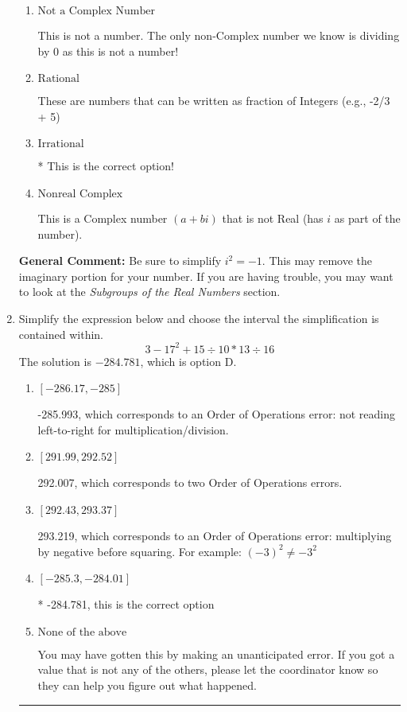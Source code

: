 \documentclass{extbook}[14pt]
\newcommand{\litem}[1]{\item #1

\rule{\textwidth}{0.4pt}}
\begin{document}
\begin{enumerate}
{\begin{enumerate}[label=\Alph*.]
This is a Complex number $(a+bi)$ that \textbf{only} has an imaginary part like $2i$.
\item \( \text{Not a Complex Number} \)

This is not a number. The only non-Complex number we know is dividing by 0 as this is not a number!
\item \( \text{Rational} \)

These are numbers that can be written as fraction of Integers (e.g., -2/3 + 5)
\item \( \text{Irrational} \)

* This is the correct option!
\item \( \text{Nonreal Complex} \)

This is a Complex number $(a+bi)$ that is not Real (has $i$ as part of the number).
\end{enumerate}

\textbf{General Comment:} Be sure to simplify $i^2 = -1$. This may remove the imaginary portion for your number. If you are having trouble, you may want to look at the \textit{Subgroups of the Real Numbers} section.
}
\litem{
Simplify the expression below and choose the interval the simplification is contained within.
\[ 3 - 17^2 + 15 \div 10 * 13 \div 16 \]The solution is \( -284.781 \), which is option D.\begin{enumerate}[label=\Alph*.]
\item \( [-286.17, -285] \)

 -285.993, which corresponds to an Order of Operations error: not reading left-to-right for multiplication/division.
\item \( [291.99, 292.52] \)

 292.007, which corresponds to two Order of Operations errors.
\item \( [292.43, 293.37] \)

 293.219, which corresponds to an Order of Operations error: multiplying by negative before squaring. For example: $(-3)^2 \neq -3^2$
\item \( [-285.3, -284.01] \)

* -284.781, this is the correct option
\item \( \text{None of the above} \)

 You may have gotten this by making an unanticipated error. If you got a value that is not any of the others, please let the coordinator know so they can help you figure out what happened.
\end{enumerate}

}
\end{enumerate}
\end{document}
